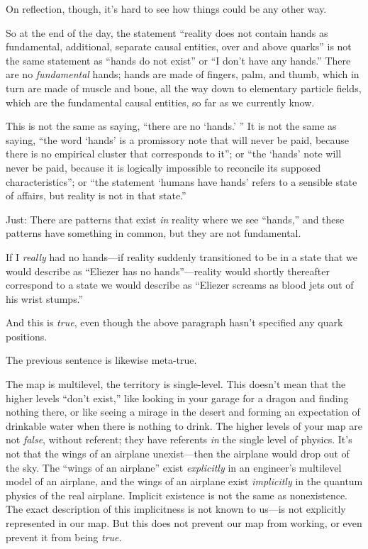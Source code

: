 {
 On reflection, though, it's hard to see how things
could be any other way.}

{
 So at the end of the day, the statement ``reality
does not contain hands as fundamental, additional, separate causal
entities, over and above quarks'' is not the same
statement as ``hands do not exist''
or ``I don't have any
hands.'' There are no \textit{fundamental} hands;
hands are made of fingers, palm, and thumb, which in turn are made of
muscle and bone, all the way down to elementary particle fields, which
are the fundamental causal entities, so far as we currently know.}

{
 This is not the same as saying, ``there are no
`hands.' '' It is not
the same as saying, ``the word
`hands' is a promissory note that will
never be paid, because there is no empirical cluster that corresponds
to it''; or ``the
`hands' note will never be paid, because
it is logically impossible to reconcile its supposed
characteristics''; or ``the
statement `humans have hands' refers to
a sensible state of affairs, but reality is not in that
state.''}

{
 Just: There are patterns that exist \textit{in} reality where we
see ``hands,'' and these patterns
have something in common, but they are not fundamental.}

{
 If I \textit{really} had no hands---if reality suddenly
transitioned to be in a state that we would describe as
``Eliezer has no hands''---reality
would shortly thereafter correspond to a state we would describe as
``Eliezer screams as blood jets out of his wrist
stumps.''}

{
 And this is \textit{true}, even though the above paragraph
hasn't specified any quark positions.}

{
 The previous sentence is likewise meta-true.}

{
 The map is multilevel, the territory is single-level. This
doesn't mean that the higher levels
``don't exist,''
like looking in your garage for a dragon and finding nothing there, or
like seeing a mirage in the desert and forming an expectation of
drinkable water when there is nothing to drink. The higher levels of
your map are not \textit{false}, without referent; they have referents
\textit{in} the single level of physics. It's not that
the wings of an airplane unexist---then the airplane would drop out of
the sky. The ``wings of an
airplane'' exist \textit{explicitly} in an
engineer's multilevel model of an airplane, and the
wings of an airplane exist \textit{implicitly} in the quantum physics
of the real airplane. Implicit existence is not the same as
nonexistence. The exact description of this implicitness is not known
to us---is not explicitly represented in our map. But this does not
prevent our map from working, or even prevent it from being
\textit{true.}}

